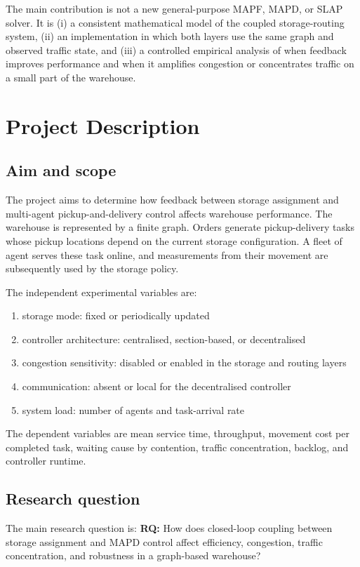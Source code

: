 \documentclass[../main.tex]{subfiles}
\begin{document}
The main contribution is not a new general-purpose MAPF, MAPD, or SLAP solver. It is (i) a consistent mathematical model of the coupled storage-routing system, (ii) an implementation in which both layers use the same graph and observed traffic state, and (iii) a controlled empirical analysis of when feedback improves performance and when it amplifies congestion or concentrates traffic on a small part of the warehouse.

\section{Project Description}
\label{sec:project-description}

\subsection{Aim and scope}
\label{sec:pd-aim-and-scope}
The project aims to determine how feedback between storage assignment and multi-agent pickup-and-delivery control affects warehouse performance. The warehouse is represented by a finite graph. Orders generate pickup-delivery tasks whose pickup locations depend on the current storage configuration. A fleet of agent serves these task online, and measurements from their movement are subsequently  used by the storage policy.

The independent experimental variables are:
\begin{enumerate}
    \item storage mode: fixed or periodically updated
    \item controller architecture: centralised, section-based, or decentralised
    \item congestion sensitivity: disabled or enabled in the storage and routing layers
    \item communication: absent or local for the decentralised controller
    \item system load: number of agents and task-arrival rate
\end{enumerate}
The dependent variables are mean service time, throughput, movement cost per completed task, waiting cause by contention, traffic concentration, backlog, and controller runtime.

\subsection{Research question}
\label{sec:pd-rq}
The main research question is: \newline
\textbf{RQ:} How does closed-loop coupling between storage assignment and MAPD
control affect efficiency, congestion, traffic concentration, and robustness
in a graph-based warehouse?\\
\end{document}
